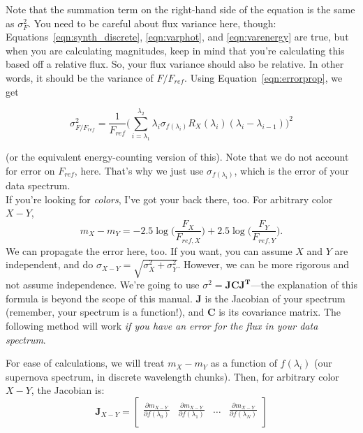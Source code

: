 Note that the summation term on the right-hand side of the equation is the same as $\sigma_{F}^{2}$. You need to be careful about flux variance here, though: Equations~\ref{eqn:synth_discrete},   \ref{eqn:varphot}, and \ref{eqn:varenergy} are true, but when you are calculating magnitudes, keep in mind that you're calculating this based off a relative flux. So, your flux variance should also be relative. In other words, it should be the variance of $F/F_{ref}$. Using Equation~\ref{eqn:errorprop}, we get

\begin{equation}
    \sigma^{2}_{F/F_{ref}} = \frac{1}{F_{ref}}\Big( \sum_{i=\lambda_{1}}^{\lambda_{2}} \lambda_{i}\sigma_{f(\lambda_{i})} R_{X}(\lambda_{i})(\lambda_{i} - \lambda_{i-1}) \Big)^{2}
\end{equation}

(or the equivalent energy-counting version of this). Note that we do not account for error on $F_{ref}$, here. That's why we just use $\sigma_{f(\lambda_{i})}$, which is the error of your data spectrum. \\

If you're looking for \textit{colors}, I've got your back there, too. For arbitrary color $X-Y$,
\begin{equation}
    m_{X} - m_{Y} = -2.5\log \Big( \frac{F_{X}}{F_{ref,X}} \Big) + 2.5\log \Big( \frac{F_{Y}}{F_{ref,Y}} \Big).
\end{equation}
We can propagate the error here, too. If you want, you can assume $X$ and $Y$ are independent, and do $\sigma_{X-Y} = \sqrt{\sigma_{X}^{2} + \sigma_{Y}^{2}}$. However, we can be more rigorous and not assume independence. We're going to use $\sigma^{2} = \mathbf{JCJ^{T}}$---the explanation of this formula is beyond the scope of this manual. $\mathbf{J}$ is the Jacobian of your spectrum (remember, your spectrum is a function!), and $\mathbf{C}$ is its covariance matrix. The following method will work \textit{if you have an error for the flux in your data spectrum}.

For ease of calculations, we will treat $m_{X}-m_{Y}$ as a function of $f(\lambda_{i})$ (our supernova spectrum, in discrete wavelength chunks). Then, for arbitrary color $X-Y$, the Jacobian is:
\begin{equation}
\label{eqn:jac2}
\mathbf{J}_{X-Y} = 
\begin{bmatrix}
    
        \frac{\partial m_{X-Y}}{\partial f(\lambda_{0})} & \frac{\partial m_{X-Y}}{\partial f (\lambda_{1})} & \dots & \frac{\partial m_{X-Y}}{\partial f(\lambda_{N})} \\
    
\end{bmatrix}
\end{equation}

